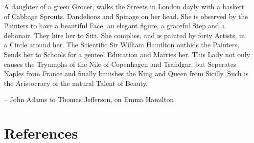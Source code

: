 \documentclass[
]{article}
\theoremstyle{definition}
\theoremstyle{definition}
\theoremstyle{definition}
\theoremstyle{definition}
\theoremstyle{remark}
\begin{document}
A daughter of a green Grocer, walks the Streets in London dayly with a
baskett of Cabbage Sprouts, Dandelions and Spinage on her head. She is
observed by the Painters to have a beautiful Face, an elegant figure, a
graceful Step and a debonair. They hire her to Sitt. She complies, and
is painted by forty Artists, in a Circle around her. The Scientific Sir
William Hamilton outbids the Painters, Sends her to Schools for a
genteel Education and Marries her. This Lady not only causes the
Tryumphs of the Nile of Copenhagen and Trafalgar, but Seperates Naples
from France and finally banishes the King and Queen from Sicilly. Such
is the Aristocracy of the natural Talent of Beauty.

-- John Adams to Thomas Jefferson, on Emma Hamilton

\newpage

\hypertarget{references}{%
\section*{References}\label{references}}
\end{document}

